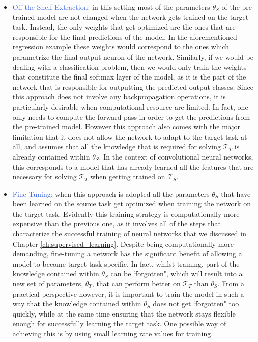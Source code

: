 \begin{itemize}
	\item \textcolor{RoyalBlue}{Off the Shelf Extraction:} in this setting most of the parameters $\theta_S$ of the pre-trained model are not changed when the network gets trained on the target task. Instead, the only weights that get optimized are the ones that are responsible for the final predictions of the model. In the aforementioned regression example these weights would correspond to the ones which parametrize the final output neuron of the network. Similarly, if we would be dealing with a classification problem, then we would only train the weights that constitute the final softmax layer of the model, as it is the part of the network that is responsible for outputting the predicted output classes. Since this approach does not involve any backpropagation operations, it is particularly desirable when computational resource are limited. In fact, one only needs to compute the forward pass in order to get the predictions from the pre-trained model. However this approach also comes with the major limitation that it does not allow the network to adapt to the target task at all, and assumes that all the knowledge that is required for solving $\mathcal{T}_T$ is already contained within $\theta_S$. In the context of convolutional neural networks, this corresponds to a model that has already learned all the features that are necessary for solving $\mathcal{T}_T$ when getting trained on $\mathcal{T}_S$.   

	\item \textcolor{RoyalBlue}{Fine-Tuning:} when this approach is adopted all the parameters $\theta_S$ that have been learned on the source task get optimized when training the network on the target task. Evidently this training strategy is computationally more expensive than the previous one, as it involves all of the steps that characterize the successful training of neural networks that we discussed in Chapter \ref{ch:supervised_learning}. Despite being computationally more demanding, fine-tuning a network has the significant benefit of allowing a model to become target task specific. In fact, whilst training, part of the knowledge contained within $\theta_S$ can be `forgotten", which will result into a new set of parameters, $\theta_T$, that can perform better on $\mathcal{T}_T$ than $\theta_S$. From a practical perspective however, it is important to train the model in such a way that the knowledge contained within $\theta_S$ does not get `forgotten" too quickly, while at the same time ensuring that the network stays flexible enough for successfully learning the target task. One possible way of achieving this is by using small learning rate values for training.      
\end{itemize}


